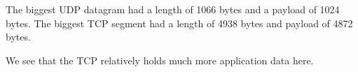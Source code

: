 The biggest UDP datagram had a length of 1066 bytes and a payload of 1024 bytes.
The biggest TCP segment had a length of 4938 bytes and payload of 4872 bytes.

We see that the TCP relatively holds much more application data here.
